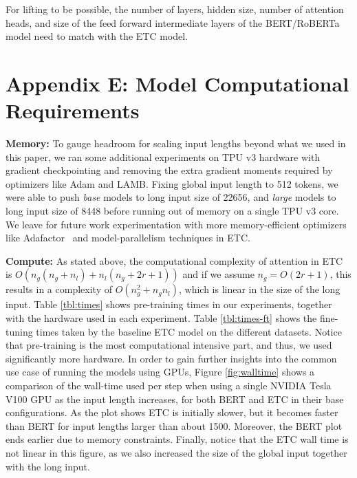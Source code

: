 \documentclass[11pt,a4paper]{article}
\begin{document}
For lifting to be possible, the number of layers, hidden size, number of attention heads, and size of the feed forward intermediate layers of the BERT/RoBERTa model need to match with the ETC model.


\section*{Appendix E: Model Computational Requirements}\label{app:parameters}


{\bf Memory:} To gauge headroom for scaling input lengths beyond what we used in this paper, we ran some additional experiments on TPU v3 hardware with gradient checkpointing and removing the extra gradient moments required by optimizers like Adam and LAMB. Fixing global input length to 512 tokens, we were able to push {\em base} models to long input size of 22656, and {\em large} models to long input size of 8448 before running out of memory on a single TPU v3 core. We leave for future work experimentation with more memory-efficient optimizers like Adafactor~\cite{shazeer2018adafactor} and model-parallelism techniques in ETC.


{\bf Compute:} As stated above, the computational complexity of attention in ETC is $O(n_g (n_g + n_l) + n_l (n_g + 2r+1 ))$ and if we assume $n_g = O(2r+1)$, this results in a complexity of $O(n_g^2 + n_g n_l)$, which is linear in the size of the long input. Table \ref{tbl:times} shows pre-training times in our experiments, together with the hardware used in each experiment. Table \ref{tbl:times-ft} shows the fine-tuning times taken by the baseline ETC model on the different datasets. Notice that pre-training is the most computational intensive part, and thus, we used significantly more hardware. In order to gain further insights into the common use case of running the models using GPUs, Figure \ref{fig:walltime} shows a comparison of the wall-time used per step when using a single NVIDIA Tesla V100 GPU as the input length increases, for both BERT and ETC in their base configurations. As the plot shows ETC is initially slower, but it becomes faster than BERT for input lengths larger than about 1500. Moreover, the BERT plot ends earlier due to memory constraints. Finally, notice that the ETC wall time is not linear in this figure, as we also increased the size of the global input together with the long input.
\end{document}
